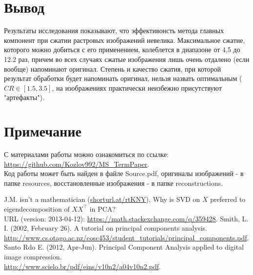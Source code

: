 \documentclass[a4paper]{article}
\begin{document}
\section{Вывод}
Результаты исследования показывают, что эффективонсть метода главных компонент при сжатии растровых изображений невелика. Максимальное сжатие, которого можно добиться с его применением, колеблется в диапазоне от 4,5 до 12.2 раз, причем во всех случаях сжатые изображения лишь очень отдалено (если вообще) напоминают оригинал. Степень и качество сжатия, при которой результат обработки будет напоминать оригинал, нельзя назвать оптимальным ($CR\in [1.5,3.5]$, на изображениях практически неизбежно присутствуют "артефакты").
\section*{Примечание}
С материалами работы можно ознакомиться по ссылке: \url{https://github.com/Kozlov992/MS_TermPaper}.\\ Код работы может быть найден в файле Source.pdf, оригиналы изображений - в папке resources, восстановленные изображения - в папке reconstructions.
\begin{thebibliography}{9}
J.M. isn't a mathematician (\url{shorturl.at/rtKNY}), Why is SVD on $X$ preferred to eigendecomposition of $XX^\top$ in PCA?\\URL (version: 2013-04-12): \url{https://math.stackexchange.com/q/359428}.
Smith, L. I. (2002, February 26). A tutorial on principal components analysis.\\
\url{http://www.cs.otago.ac.nz/cosc453/student_tutorials/principal_components.pdf}.
Santo Rdo E. (2012,  Apr-Jun). Principal Component Analysis applied to digital image compression.\\
\url{http://www.scielo.br/pdf/eins/v10n2/a04v10n2.pdf}.
\end{thebibliography}
\end{document}
